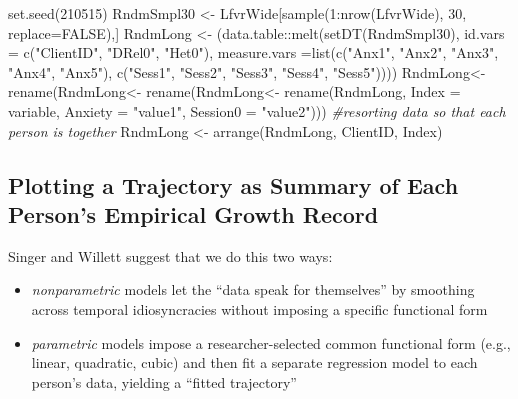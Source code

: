 \documentclass[
  english,
]{book}
\newenvironment{Shaded}{\begin{snugshade}}{\end{snugshade}}
\newcommand{\AttributeTok}[1]{\textcolor[rgb]{0.77,0.63,0.00}{#1}}
\newcommand{\CommentTok}[1]{\textcolor[rgb]{0.56,0.35,0.01}{\textit{#1}}}
\newcommand{\ConstantTok}[1]{\textcolor[rgb]{0.00,0.00,0.00}{#1}}
\newcommand{\DecValTok}[1]{\textcolor[rgb]{0.00,0.00,0.81}{#1}}
\newcommand{\FunctionTok}[1]{\textcolor[rgb]{0.00,0.00,0.00}{#1}}
\newcommand{\NormalTok}[1]{#1}
\newcommand{\OtherTok}[1]{\textcolor[rgb]{0.56,0.35,0.01}{#1}}
\newcommand{\SpecialCharTok}[1]{\textcolor[rgb]{0.00,0.00,0.00}{#1}}
\newcommand{\StringTok}[1]{\textcolor[rgb]{0.31,0.60,0.02}{#1}}
\providecommand{\tightlist}{%
  \setlength{\itemsep}{0pt}\setlength{\parskip}{0pt}}
\begin{document}
\begin{Shaded}
\begin{Highlighting}[]
\FunctionTok{set.seed}\NormalTok{(}\DecValTok{210515}\NormalTok{)}
\NormalTok{RndmSmpl30 }\OtherTok{\textless{}{-}}\NormalTok{ LfvrWide[}\FunctionTok{sample}\NormalTok{(}\DecValTok{1}\SpecialCharTok{:}\FunctionTok{nrow}\NormalTok{(LfvrWide), }\DecValTok{30}\NormalTok{,}
   \AttributeTok{replace=}\ConstantTok{FALSE}\NormalTok{),] }
\NormalTok{RndmLong }\OtherTok{\textless{}{-}}\NormalTok{ (data.table}\SpecialCharTok{::}\FunctionTok{melt}\NormalTok{(}\FunctionTok{setDT}\NormalTok{(RndmSmpl30), }\AttributeTok{id.vars =} \FunctionTok{c}\NormalTok{(}\StringTok{"ClientID"}\NormalTok{, }\StringTok{"DRel0"}\NormalTok{, }\StringTok{"Het0"}\NormalTok{), }\AttributeTok{measure.vars =}\FunctionTok{list}\NormalTok{(}\FunctionTok{c}\NormalTok{(}\StringTok{"Anx1"}\NormalTok{, }\StringTok{"Anx2"}\NormalTok{, }\StringTok{"Anx3"}\NormalTok{, }\StringTok{"Anx4"}\NormalTok{, }\StringTok{"Anx5"}\NormalTok{), }\FunctionTok{c}\NormalTok{(}\StringTok{"Sess1"}\NormalTok{, }\StringTok{"Sess2"}\NormalTok{, }\StringTok{"Sess3"}\NormalTok{, }\StringTok{"Sess4"}\NormalTok{, }\StringTok{"Sess5"}\NormalTok{))))}
\NormalTok{RndmLong}\OtherTok{\textless{}{-}}  \FunctionTok{rename}\NormalTok{(RndmLong}\OtherTok{\textless{}{-}}  \FunctionTok{rename}\NormalTok{(RndmLong}\OtherTok{\textless{}{-}}  \FunctionTok{rename}\NormalTok{(RndmLong, }\AttributeTok{Index =}\NormalTok{ variable, }\AttributeTok{Anxiety =} \StringTok{"value1"}\NormalTok{, }\AttributeTok{Session0 =} \StringTok{"value2"}\NormalTok{)))}
\CommentTok{\#resorting data so that each person is together}
\NormalTok{RndmLong }\OtherTok{\textless{}{-}} \FunctionTok{arrange}\NormalTok{(RndmLong, ClientID, Index)}
\end{Highlighting}
\end{Shaded}

\hypertarget{plotting-a-trajectory-as-summary-of-each-persons-empirical-growth-record}{%
\subsection{Plotting a Trajectory as Summary of Each Person's Empirical Growth Record}\label{plotting-a-trajectory-as-summary-of-each-persons-empirical-growth-record}}

Singer and Willett \citeyearpar{singer_applied_2003} suggest that we do this two ways:

\begin{itemize}
\tightlist
\item
  \emph{nonparametric} models let the ``data speak for themselves'' by smoothing across temporal idiosyncracies without imposing a specific functional form
\item
  \emph{parametric} models impose a researcher-selected common functional form (e.g., linear, quadratic, cubic) and then fit a separate regression model to each person's data, yielding a ``fitted trajectory''
\end{itemize}
\end{document}
